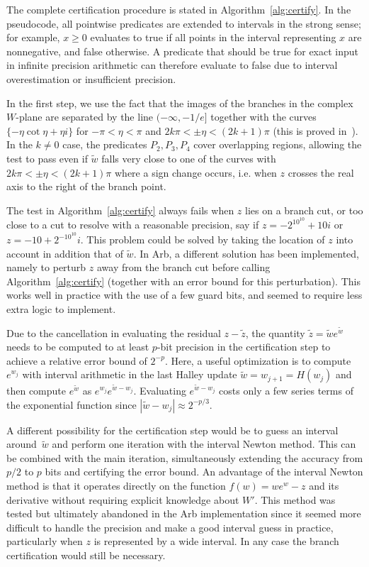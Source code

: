 \documentclass[11pt,a4paper]{article}
\begin{document}
The complete certification procedure is stated in
Algorithm~\ref{alg:certify}.
In the pseudocode,
all pointwise predicates are extended to intervals in the strong sense;
for example, $x \ge 0$ evaluates to true if all points in the interval
representing $x$ are nonnegative,
and false otherwise. A predicate that should be true for exact input
in infinite precision arithmetic
can therefore evaluate to false due to interval overestimation or
insufficient precision.

In the first step, we use the fact that the images of the
branches in the complex $W$-plane are separated by the line $(-\infty,-1/e]$
together with the curves $\{-\eta \cot \eta + \eta i\}$
for $-\pi < \eta < \pi$ and $2 k \pi < \pm \eta < (2k+1) \pi$
(this is proved in~\cite{corless1996lambertw}).
In the $k \ne 0$ case, the predicates $P_2, P_3, P_4$ cover
overlapping regions, allowing the test to pass even if $\tilde w$
falls very close to one of the curves
with $2 k \pi < \pm \eta < (2k+1) \pi$ where a sign change occurs, i.e.
when $z$ crosses the real axis to the right of the branch point.

The test in Algorithm~\ref{alg:certify} always fails when
$z$ lies on a branch cut, or too close to a cut to resolve with
a reasonable precision, say if
$z = -2^{10^{10}} + 10i$ or $z = -10 + 2^{-10^{10}} i$.
This problem could be solved by
taking the location of $z$ into account in addition that of $\tilde w$.
In Arb, a different solution has been implemented,
namely to perturb $z$ away from the branch cut
before calling Algorithm~\ref{alg:certify} (together with an error bound
for this perturbation).
This works well in practice
with the use of a few guard bits, and seemed to require less extra logic to implement.

Due to the cancellation in evaluating the residual $z-\tilde z$, the quantity
$\tilde z = \tilde w e^{\tilde w}$
needs to be computed to at least $p$-bit precision in the certification step
to achieve a relative error bound of $2^{-p}$.
Here, a useful optimization is to compute $e^{w_j}$ with interval arithmetic
in the last Halley update $\tilde w = w_{j+1} = H(w_j)$
and then compute $e^{\tilde w}$ as $e^{w_j} e^{\tilde w - w_j}$.
Evaluating $e^{\tilde w - w_j}$ costs only a few series
terms of the exponential function since
$|\tilde w - w_j| \approx 2^{-p/3}$.

A different possibility for the certification step would be to
guess an interval around~$\tilde w$ and
perform one iteration with the interval Newton method.
This can be combined with the main iteration, simultaneously
extending the accuracy from $p/2$ to $p$ bits and certifying the error bound.
An advantage of the interval Newton method is that it operates directly
on the function $f(w) = w e^w - z$ and its derivative without requiring
explicit knowledge about $W'$.
This method was tested but ultimately abandoned in the Arb implementation
since it seemed more difficult to handle the precision and
make a good interval guess in practice, particularly
when $z$ is represented by a wide interval. In any case
the branch certification would still be necessary.
\end{document}
